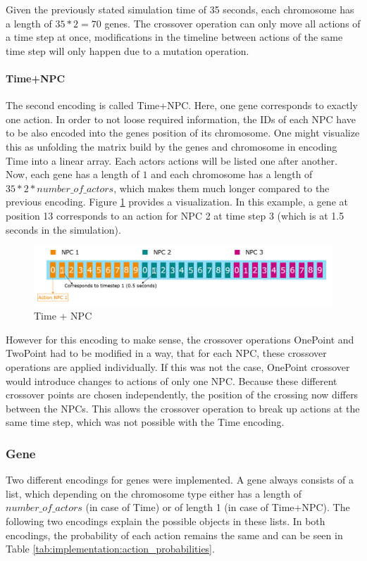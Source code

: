 Given the previously stated simulation time of 35 seconds, each chromosome has a length of $35 * 2 = 70$ genes.
The crossover operation can only move all actions of a time step at once, modifications in the timeline between actions of the same time step will only happen due to a mutation operation.

\paragraph{Time+NPC}
The second encoding is called Time+NPC. Here, one gene corresponds to exactly one action. In order to not loose required information, the IDs of each NPC have to be also encoded into the genes position of its chromosome. One might visualize this as unfolding the matrix build by the genes and chromosome in encoding Time into a linear array. Each actors actions will be listed one after another. Now, each gene has a length of $1$ and each chromosome has a length of $35 * 2 * number\_of\_actors$, which makes them much longer compared to the previous encoding. Figure \ref{fig:implementation:encoding_chromosome_time_npc} provides a visualization. In this example, a gene at position 13 corresponds to an action for NPC 2 at time step 3 (which is at 1.5 seconds in the simulation).

\begin{figure}[ht] 
	\includegraphics[width=1\linewidth]{figures/time_npc_encoding}
	\caption{Time + NPC}
	\label{fig:implementation:encoding_chromosome_time_npc}
\end{figure}

However for this encoding to make sense, the crossover operations OnePoint and TwoPoint had to be modified in a way, that for each NPC, these crossover operations are applied individually. If this was not the case, OnePoint crossover would introduce changes to actions of only one NPC. Because these different crossover points are chosen independently, the position of the crossing now differs between the NPCs. This allows the crossover operation to break up actions at the same time step, which was not possible with the Time encoding.

\subsubsection{Gene}
Two different encodings for genes were implemented. A gene always consists of a list, which depending on the chromosome type either has a length of $number\_of\_actors$ (in case of Time) or of length 1 (in case of Time+NPC). The following two encodings explain the possible objects in these lists. In both encodings, the probability of each action remains the same and can be seen in Table \ref{tab:implementation:action_probabilities}.

